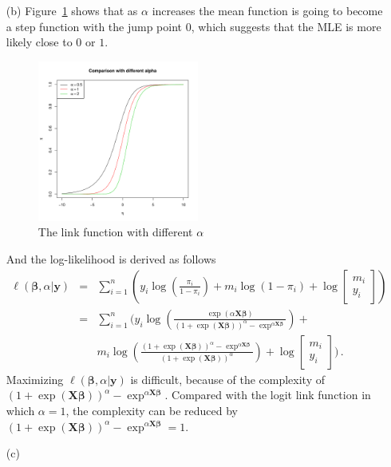 \documentclass[]{article}
\begin{document}
\begin{enumerate}
{\begin{itemize}
        	\item[(b)]
        	Figure~\ref{3} shows that as $\alpha$ increases the mean function is going to become a step function with the jump point $0$, which suggests that the MLE is more likely close to $0$ or $1$.
        	\begin{figure}[ht!]
        		\centering
        		\includegraphics[width = 0.5\textwidth]{pic/HW3_1/b.pdf}
        		\caption{The link function with different $\alpha$}
        		\label{3}
        	\end{figure}
        	And the log-likelihood is derived as follows
        	\begin{eqnarray}
        	\ell(\bm{\beta}, \alpha|\bm{y}) & = & \sum_{i = 1}^{n}(y_i\log(\frac{\pi_i}{1-\pi_i}) + m_i\log(1-\pi_i) + \log\begin{bmatrix}
        	m_i\\ y_i
        	\end{bmatrix}) \\
        	& = & \sum_{i = 1}^{n} (y_i\log(\frac{\exp(\alpha\bm X\bm\beta)}{(1+\exp(\bm X\bm{\beta}))^\alpha - \exp^{\alpha\bm{X}\bm\beta}}) +\\
        	& & m_i\log(\frac{(1+\exp(\bm X\bm{\beta}))^\alpha - \exp^{\alpha\bm{X}\bm\beta}}{(1+\exp(\bm X\bm{\beta}))^\alpha}) + \log\begin{bmatrix}
        	m_i \\ y_i
        	\end{bmatrix}  )\,.
        	\end{eqnarray}
        	Maximizing $\ell(\bm{\beta}, \alpha|\bm{y})$ is difficult, because of the complexity of $(1+\exp(\bm X\bm{\beta}))^\alpha - \exp^{\alpha\bm{X}\bm\beta}$. Compared with the logit link function in which $\alpha = 1$, the complexity can be reduced by $(1+\exp(\bm X\bm{\beta}))^\alpha - \exp^{\alpha\bm{X}\bm\beta} = 1$.
        	\item[(c)] 

\end{itemize}}
\end{enumerate}
\end{document}
